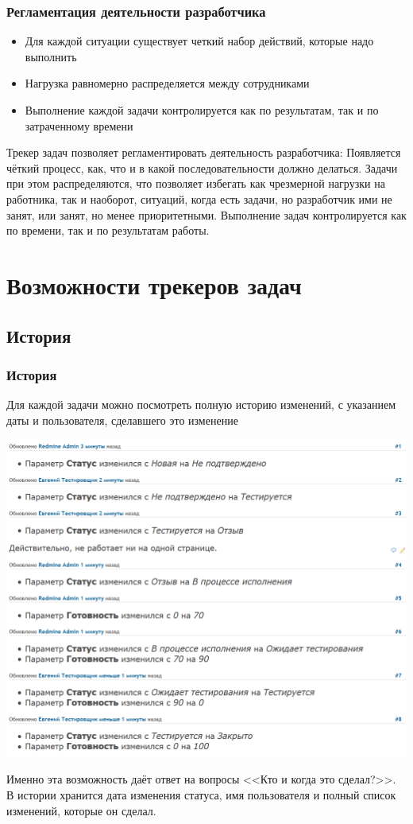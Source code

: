 \documentclass{../industrial-development}
\begin{document}
\begin{frame} \frametitle{Регламентация деятельности разработчика}
	\begin{itemize}
		\item Для каждой ситуации существует четкий набор действий, которые надо выполнить		
		\item Нагрузка равномерно распределяется между сотрудниками
		\item Выполнение каждой задачи контролируется как по результатам, так и по затраченному времени
	\end{itemize}
\end{frame}

\lecturenotes

Трекер задач позволяет регламентировать деятельность разработчика:
Появляется чёткий процесс, как, что и в какой последовательности должно делаться.
Задачи при этом распределяются, что позволяет избегать как чрезмерной нагрузки на работника, так и наоборот, ситуаций, когда есть задачи, но разработчик ими не занят, или занят, но менее приоритетными.
Выполнение задач контролируется как по времени, так и по результатам работы.

\section{Возможности трекеров задач}
\subsection{История}
\begin{frame} \frametitle{История}
Для каждой задачи можно посмотреть полную историю изменений, с указанием даты и пользователя, сделавшего это изменение
\centerline{\includegraphics[width=\textwidth]{history.png}}
\end{frame}
\lecturenotes
Именно эта возможность даёт ответ на вопросы <<Кто и когда это сделал?>>.
В истории хранится дата изменения статуса, имя пользователя и полный список изменений, которые он сделал.
\end{document}
